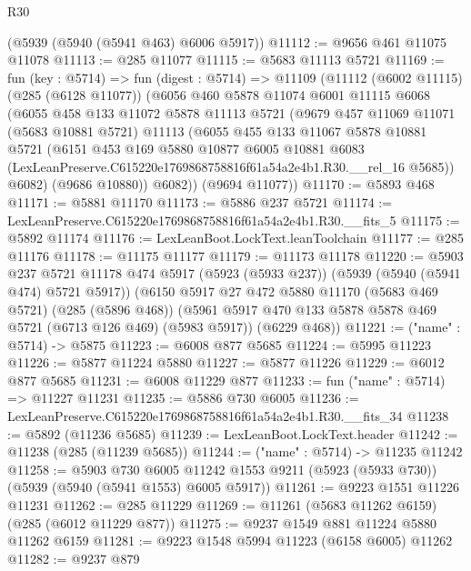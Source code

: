 \begin{lexlean}{R30}
\begin{coremodule}
    (@5939 (@5940 (@5941 @463) @6006 @5917))
@11112 := @9656 @461 @11075 @11078
@11113 := @285 @11077
@11115 := @5683 @11113 @5721
@11169 := fun (key : @5714) =>
  fun (digest : @5714) =>
  @11109
    (@11112
      (@6002 @11115)
      (@285 (@6128 @11077))
      (@6056
        @460
        @5878
        @11074
        @6001
        @11115
        @6068
        (@6055
          @458
          @133
          @11072
          @5878
          @11113
          @5721
          (@9679
            @457
            @11069
            @11071
            (@5683 @10881 @5721)
            @11113
            (@6055
              @455
              @133
              @11067
              @5878
              @10881
              @5721
              (@6151
                @453
                @169
                @5880
                @10877
                @6005
                @10881
                @6083
                (LexLeanPreserve.C615220e1769868758816f61a54a2e4b1.R30.__rel_16 @5685))
              @6082)
            (@9686 @10880))
          @6082))
      (@9694 @11077))
@11170 := @5893 @468
@11171 := @5881 @11170
@11173 := @5886 @237 @5721
@11174 := LexLeanPreserve.C615220e1769868758816f61a54a2e4b1.R30.__fits_5
@11175 := @5892 @11174
@11176 := LexLeanBoot.LockText.leanToolchain
@11177 := @285 @11176
@11178 := @11175 @11177
@11179 := @11173 @11178
@11220 := @5903
    @237
    @5721
    @11178
    @474
    @5917
    (@5923 (@5933 @237))
    (@5939 (@5940 (@5941 @474) @5721 @5917))
    (@6150
      @5917
      @27
      @472
      @5880
      @11170
      (@5683 @469 @5721)
      (@285 (@5896 @468))
      (@5961 @5917 @470 @133 @5878 @5878 @469 @5721 (@6713 @126 @469) (@5983 @5917))
      (@6229 @468))
@11221 := ("name" : @5714) -> @5875
@11223 := @6008 @877 @5685
@11224 := @5995 @11223
@11226 := @5877 @11224 @5880
@11227 := @5877 @11226
@11229 := @6012 @877 @5685
@11231 := @6008 @11229 @877
@11233 := fun ("name" : @5714) => @11227 @11231
@11235 := @5886 @730 @6005
@11236 := LexLeanPreserve.C615220e1769868758816f61a54a2e4b1.R30.__fits_34
@11238 := @5892 (@11236 @5685)
@11239 := LexLeanBoot.LockText.header
@11242 := @11238 (@285 (@11239 @5685))
@11244 := ("name" : @5714) -> @11235 @11242
@11258 := @5903
    @730
    @6005
    @11242
    @1553
    @9211
    (@5923 (@5933 @730))
    (@5939 (@5940 (@5941 @1553) @6005 @5917))
@11261 := @9223 @1551 @11226 @11231
@11262 := @285 @11229
@11269 := @11261 (@5683 @11262 @6159) (@285 (@6012 @11229 @877))
@11275 := @9237 @1549 @881 @11224 @5880 @11262 @6159
@11281 := @9223 @1548 @5994 @11223 (@6158 @6005) @11262
@11282 := @9237 @879

\end{coremodule}
\end{lexlean}
